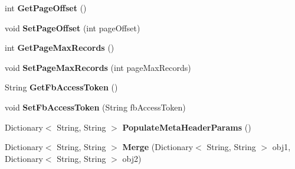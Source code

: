 \begin{DoxyCompactItemize}
\item 
\hypertarget{classcom_1_1shephertz_1_1app42_1_1paas_1_1sdk_1_1csharp_1_1_app42_service_af611cb939372b24f61c9ebaa9787ae34}{int {\bfseries Get\+Page\+Offset} ()}\label{classcom_1_1shephertz_1_1app42_1_1paas_1_1sdk_1_1csharp_1_1_app42_service_af611cb939372b24f61c9ebaa9787ae34}

\item 
\hypertarget{classcom_1_1shephertz_1_1app42_1_1paas_1_1sdk_1_1csharp_1_1_app42_service_acf03b7b2946b4b4d5ad3c4ebe37dd4e7}{void {\bfseries Set\+Page\+Offset} (int page\+Offset)}\label{classcom_1_1shephertz_1_1app42_1_1paas_1_1sdk_1_1csharp_1_1_app42_service_acf03b7b2946b4b4d5ad3c4ebe37dd4e7}

\item 
\hypertarget{classcom_1_1shephertz_1_1app42_1_1paas_1_1sdk_1_1csharp_1_1_app42_service_afd9ad42e5fb84a4c89ac63b1357ca98d}{int {\bfseries Get\+Page\+Max\+Records} ()}\label{classcom_1_1shephertz_1_1app42_1_1paas_1_1sdk_1_1csharp_1_1_app42_service_afd9ad42e5fb84a4c89ac63b1357ca98d}

\item 
\hypertarget{classcom_1_1shephertz_1_1app42_1_1paas_1_1sdk_1_1csharp_1_1_app42_service_a34de0f0fb119a76140d342a4198ace22}{void {\bfseries Set\+Page\+Max\+Records} (int page\+Max\+Records)}\label{classcom_1_1shephertz_1_1app42_1_1paas_1_1sdk_1_1csharp_1_1_app42_service_a34de0f0fb119a76140d342a4198ace22}

\item 
\hypertarget{classcom_1_1shephertz_1_1app42_1_1paas_1_1sdk_1_1csharp_1_1_app42_service_a39628509115db109f31c9a554e6742f7}{String {\bfseries Get\+Fb\+Access\+Token} ()}\label{classcom_1_1shephertz_1_1app42_1_1paas_1_1sdk_1_1csharp_1_1_app42_service_a39628509115db109f31c9a554e6742f7}

\item 
\hypertarget{classcom_1_1shephertz_1_1app42_1_1paas_1_1sdk_1_1csharp_1_1_app42_service_ab32d19b6f84b1ac7c9d2b1dac5383fba}{void {\bfseries Set\+Fb\+Access\+Token} (String fb\+Access\+Token)}\label{classcom_1_1shephertz_1_1app42_1_1paas_1_1sdk_1_1csharp_1_1_app42_service_ab32d19b6f84b1ac7c9d2b1dac5383fba}

\item 
\hypertarget{classcom_1_1shephertz_1_1app42_1_1paas_1_1sdk_1_1csharp_1_1_app42_service_a1c7a71714aefc82278e57334c7e122e3}{Dictionary$<$ String, String $>$ {\bfseries Populate\+Meta\+Header\+Params} ()}\label{classcom_1_1shephertz_1_1app42_1_1paas_1_1sdk_1_1csharp_1_1_app42_service_a1c7a71714aefc82278e57334c7e122e3}

\item 
\hypertarget{classcom_1_1shephertz_1_1app42_1_1paas_1_1sdk_1_1csharp_1_1_app42_service_a6624eaf20afa8c8d1fbd9c835b438ada}{Dictionary$<$ String, String $>$ {\bfseries Merge} (Dictionary$<$ String, String $>$ obj1, Dictionary$<$ String, String $>$ obj2)}\label{classcom_1_1shephertz_1_1app42_1_1paas_1_1sdk_1_1csharp_1_1_app42_service_a6624eaf20afa8c8d1fbd9c835b438ada}

\end{DoxyCompactItemize}
